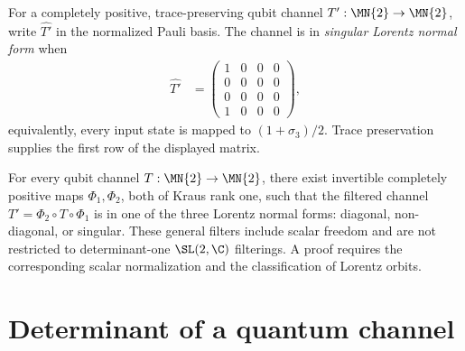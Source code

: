 \begin{definition}\label{def:lorentz_singular}
    \leanok
    For a completely positive, trace-preserving qubit channel
    $T' : \MN{2} \to \MN{2}$, write $\widehat{T'}$ in the normalized
    Pauli basis. The channel is in \emph{singular Lorentz normal form} when
    \begin{align}
        \widehat{T'}
        &=
        \begin{pmatrix}
            1 & 0 & 0 & 0 \\
            0 & 0 & 0 & 0 \\
            0 & 0 & 0 & 0 \\
            1 & 0 & 0 & 0
        \end{pmatrix},
        \label{eq:representations_lorentz_singular}
    \end{align}
    equivalently, every input state is mapped to $(1+\sigma_{3})/2$.
    Trace preservation supplies the first row of the displayed matrix.
\end{definition}

\begin{theorem}\label{thm:lorentz_normal_form_qubit}
    For every qubit channel $T : \MN{2} \to \MN{2}$, there exist invertible
    completely positive maps $\Phi_{1},\Phi_{2}$, both of Kraus rank one, such
    that the filtered channel $T'=\Phi_{2}\circ T\circ\Phi_{1}$ is in one
    of the three Lorentz normal forms: diagonal, non-diagonal, or singular.
    These general filters include scalar freedom and are not restricted to
    determinant-one $\SL(2,\C)$ filterings. A proof requires the corresponding
    scalar normalization and the classification of Lorentz orbits.
\end{theorem}


\section{Determinant of a quantum channel}
\label{sec:channel_determinant}

